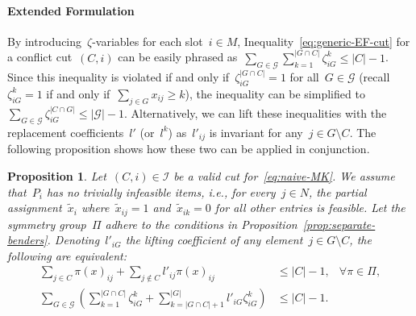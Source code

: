 \documentclass[a4paper,10pt]{article}
\newcommand{\lift}{l}
\newtheorem{proposition}[theorem]{Proposition}
\theoremstyle{definition}
\begin{document}
\paragraph{Extended Formulation}
By introducing~$\zeta$-variables for each slot~$i \in M$, Inequality~\eqref{eq:generic-EF-cut} for a conflict cut~$(C,i)$ can be easily phrased as~$\sum_{G\in \mathcal{G}} \sum_{k = 1}^{|G\cap C|} \zeta^k_{iG} \leq |C| -1$.
Since this inequality is violated if and only if~$\zeta^{|G\cap C|}_{iG} = 1$ for all~$G \in \mathcal{G}$ (recall~$\zeta^k_{iG} = 1$ if and only if~$\sum_{j \in G}x_{ij} \geq k$), the inequality can be simplified to~$\sum_{G\in \mathcal{G}} \zeta_{iG}^{|C\cap G|} \leq |\mathcal{G}| -1$.
Alternatively, we can lift these inequalities with the replacement coefficients~$\lift'$ (or~$\lift^k$) as~$\lift'_{ij}$ is invariant for any~$j\in G\setminus C$.
The following proposition shows how these two can be applied in conjunction.
%
\begin{proposition}
  Let~$(C, i)\in\mathcal{I}$ be a valid cut for~\eqref{eq:naive-MK}.
  We assume that~$P_i$ has no trivially infeasible items, i.e., for every~$j\in N$, the partial assignment~$\tilde{x}_i$ where~$\tilde{x}_{ij} = 1$ and~$\tilde{x}_{ik} = 0$ for all other entries is feasible.  
  Let the symmetry group~$\Pi$ adhere to the conditions in Proposition~\ref{prop:separate-benders}.
  Denoting~$\lift'_{iG}$ the lifting coefficient of any element~$j\in G\setminus C$, the following are equivalent:
  \begin{align}
    \sum_{j\in C} \pi(x)_{ij} + 
    \sum_{j\notin C} \lift'_{ij} \pi(x)_{ij} &\leq |C|-1,
    & \forall\pi\in\Pi, \label{eq:lifted-vanilla}
    \\
    \sum_{G\in\mathcal{G}}\left(
      \sum_{k=1}^{|G\cap C|} \zeta^k_{iG} 
      +\sum_{k = |G\cap C| + 1}^{|G|} \lift'_{iG} \zeta^k_{iG}
    \right) &\leq |C| - 1.
    \label{eq:lifted-zeta}
  \end{align}
\end{proposition}
\end{document}
